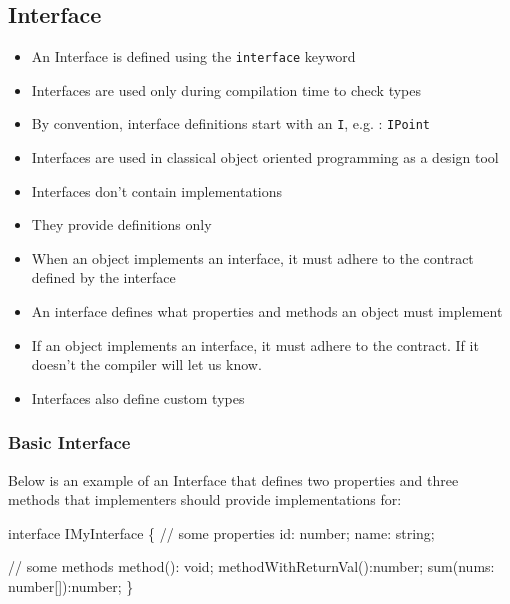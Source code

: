 \documentclass[12pt,]{article}
\newenvironment{Shaded}{}{}
\newcommand{\KeywordTok}[1]{\textcolor[rgb]{0.00,0.00,1.00}{{#1}}}
\newcommand{\DataTypeTok}[1]{{#1}}
\newcommand{\CommentTok}[1]{\textcolor[rgb]{0.00,0.50,0.00}{{#1}}}
\newcommand{\FunctionTok}[1]{{#1}}
\newcommand{\NormalTok}[1]{{#1}}
\providecommand{\tightlist}{%
  \setlength{\itemsep}{0pt}\setlength{\parskip}{0pt}}
\begin{document}
\subsection{Interface}\label{interface}

\begin{itemize}
\tightlist
\item
  An Interface is defined using the \texttt{interface} keyword
\item
  Interfaces are used only during compilation time to check types
\item
  By convention, interface definitions start with an \texttt{I}, e.g. :
  \texttt{IPoint}
\item
  Interfaces are used in classical object oriented programming as a
  design tool
\item
  Interfaces don't contain implementations
\item
  They provide definitions only
\item
  When an object implements an interface, it must adhere to the contract
  defined by the interface
\item
  An interface defines what properties and methods an object must
  implement
\item
  If an object implements an interface, it must adhere to the contract.
  If it doesn't the compiler will let us know.
\item
  Interfaces also define custom types
\end{itemize}

\subsubsection{Basic Interface}\label{basic-interface}

Below is an example of an Interface that defines two properties and
three methods that implementers should provide implementations for:

\begin{Shaded}
\begin{Highlighting}[numbers=left,,]
\KeywordTok{interface} \NormalTok{IMyInterface \{}
  \CommentTok{// some properties}
  \NormalTok{id: number;}
  \NormalTok{name: string;}

  \CommentTok{// some methods}
  \FunctionTok{method}\NormalTok{(): }\DataTypeTok{void}\NormalTok{;}
  \FunctionTok{methodWithReturnVal}\NormalTok{():number;}
  \FunctionTok{sum}\NormalTok{(nums: number[]):number;}
\NormalTok{\}}
\end{Highlighting}
\end{Shaded}
\end{document}
